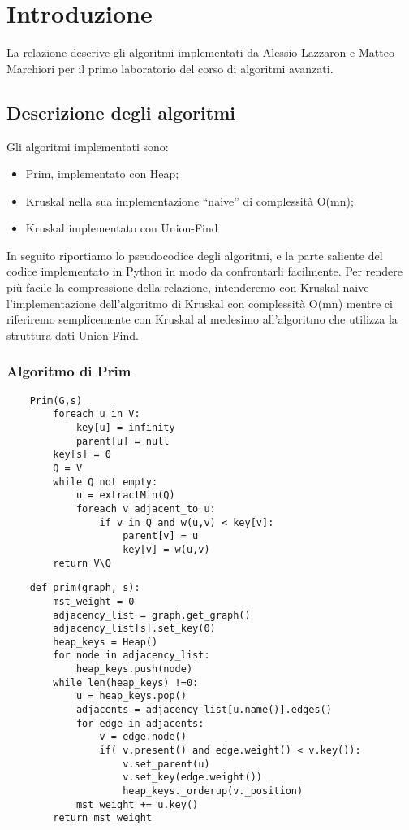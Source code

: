 \chapter{Introduzione\label{sec:introduzione}}
\noindent La relazione descrive gli algoritmi implementati da Alessio Lazzaron e Matteo Marchiori per il primo laboratorio del corso di algoritmi avanzati.

\section{Descrizione degli algoritmi\label{sec:descrizione}}
Gli algoritmi implementati sono:
\begin{itemize}
    \item Prim, implementato con Heap;
    \item Kruskal nella sua implementazione ``naive'' di complessità O(mn);
    \item Kruskal implementato con Union-Find
\end{itemize}

In seguito riportiamo lo pseudocodice degli algoritmi, e la parte saliente del codice implementato in Python in modo da confrontarli facilmente.
Per rendere più facile la compressione della relazione, intenderemo con Kruskal-naive l'implementazione dell'algoritmo di Kruskal con complessità O(mn) mentre ci riferiremo semplicemente con Kruskal al medesimo all'algoritmo che utilizza la struttura dati Union-Find.
\clearpage

\subsection{Algoritmo di Prim\label{sec:prim}}
\begin{verbatim}
    Prim(G,s)
        foreach u in V:
            key[u] = infinity
            parent[u] = null
        key[s] = 0
        Q = V
        while Q not empty:
            u = extractMin(Q)
            foreach v adjacent_to u:
                if v in Q and w(u,v) < key[v]:
                    parent[v] = u
                    key[v] = w(u,v)
        return V\Q
\end{verbatim}

\begin{verbatim}
    def prim(graph, s):
        mst_weight = 0
        adjacency_list = graph.get_graph()
        adjacency_list[s].set_key(0)
        heap_keys = Heap()
        for node in adjacency_list:
            heap_keys.push(node)
        while len(heap_keys) !=0:
            u = heap_keys.pop()
            adjacents = adjacency_list[u.name()].edges()
            for edge in adjacents:
                v = edge.node()
                if( v.present() and edge.weight() < v.key()):
                    v.set_parent(u)
                    v.set_key(edge.weight())
                    heap_keys._orderup(v._position)
            mst_weight += u.key()
        return mst_weight
\end{verbatim}

